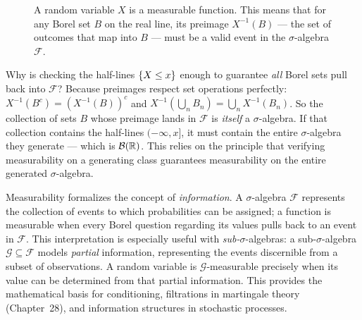 \begin{figure}[H]
\centering
{}
\caption{A random variable $X$ is a measurable function. This means that for any Borel set $B$ on the real line, its preimage $X^{-1}(B)$ --- the set of outcomes that map into $B$ --- must be a valid event in the $\sigma$-algebra $\mathcal{F}$.}
\label{ch36:fig-measurable}
\end{figure}


\begin{whybox}
Why is checking the half-lines $\{X \le x\}$ enough to guarantee \emph{all}
Borel sets pull back into $\mathcal{F}$? Because preimages respect set operations
perfectly: $X^{-1}(B^c) = (X^{-1}(B))^c$ and
$X^{-1}\!\left(\bigcup_n B_n\right) = \bigcup_n X^{-1}(B_n)$. So the collection of
sets $B$ whose preimage lands in $\mathcal{F}$ is \emph{itself} a $\sigma$-algebra.
If that collection contains the half-lines $(-\infty, x]$, it must contain the
entire $\sigma$-algebra they generate --- which is $\mathcal{B}(\mathbb{R})$. This relies
on the principle that verifying measurability on a generating class guarantees
measurability on the entire generated $\sigma$-algebra.
\end{whybox}

\begin{happeningbox}
Measurability formalizes the concept of \emph{information}. A $\sigma$-algebra
$\mathcal{F}$ represents the collection of events to which probabilities can be assigned;
a function is measurable when every Borel question regarding its values pulls back to an
event in $\mathcal{F}$. This interpretation is especially useful with \emph{sub-}$\sigma$-algebras:
a sub-$\sigma$-algebra $\mathcal{G} \subseteq \mathcal{F}$ models \emph{partial} information,
representing the events discernible from a subset of observations. A random variable is
$\mathcal{G}$-measurable precisely when its value can be determined from that partial
information. This provides the mathematical basis for conditioning, filtrations in martingale
theory (Chapter~28), and information structures in stochastic processes.
\end{happeningbox}

